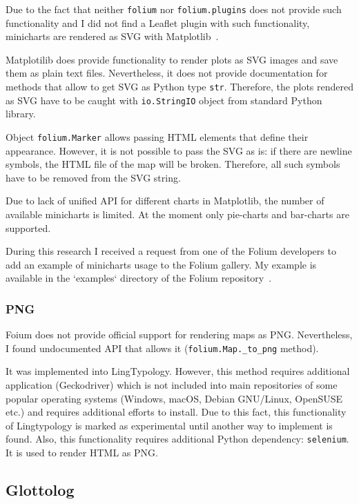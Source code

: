 \documentclass[a4paper,12pt]{article}
\begin{document}
Due to the fact that neither \texttt{folium} nor \texttt{folium.plugins} does not provide such functionality and I did not find a Leaflet plugin with such functionality, minicharts are rendered as SVG with Matplotlib~\parencite{matplotlib}.

Matplotilib does provide functionality to render plots as SVG images and save them as plain text files. Nevertheless, it does not provide documentation for methods that allow to get SVG as Python type \texttt{str}. Therefore, the plots rendered as SVG have to be caught with \texttt{io.StringIO} object from standard Python library.

Object \texttt{folium.Marker} allows passing HTML elements that define their appearance. However, it is not possible to pass the SVG as is: if there are newline symbols, the HTML file of the map will be broken. Therefore, all such symbols have to be removed from the SVG string.

Due to lack of unified API for different charts in Matplotlib, the number of available minicharts is limited. At the moment only pie-charts and bar-charts are supported.

During this research I received a request from one of the Folium developers to add an example of minicharts usage to the Folium gallery. My example is available in the `examples` directory of the Folium repository~\parencite{folium}.

\subsubsection{PNG}

Foium does not provide official support for rendering maps as PNG. Nevertheless, I found undocumented API that allows it (\texttt{folium.Map.\_to\_png} method).

It was implemented into LingTypology. However, this method requires additional application (Geckodriver) which is not included into main repositories of some popular operating systems (Windows, macOS, Debian GNU/Linux, OpenSUSE etc.) and requires additional efforts to install. Due to this fact, this functionality of Lingtypology is marked as experimental until another way to implement is found. Also, this functionality requires additional Python dependency: \texttt{selenium}. It is used to render HTML as PNG.

\subsection{Glottolog}
\end{document}
